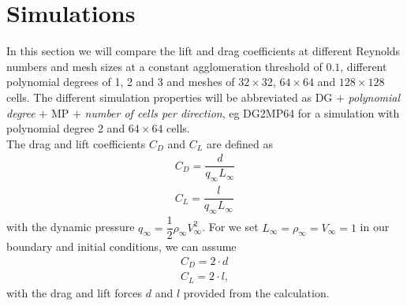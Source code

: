 \section{Simulations}
	In this section we will compare the lift and drag coefficients at different Reynolds numbers and mesh sizes at a constant agglomeration threshold of $0.1$, different polynomial degrees of 1, 2 and 3 and meshes of $32 \times 32$, $64 \times 64$ and $128 \times 128$ cells. The different simulation properties will be abbreviated as DG $+$ \textit{polynomial degree} $+$ MP $+$ \textit{number of cells per direction}, eg DG2MP64 for a simulation with polynomial degree 2 and $64 \times 64$ cells.\\
	 The drag and lift coefficients $C_D$ and $C_L$ are defined as
	\begin{align}
		C_D = \dfrac{d}{q_\infty L_\infty} \\
		C_L = \dfrac{l}{q_\infty L_\infty}
	\end{align}
	with the dynamic pressure $q_\infty = \dfrac{1}{2} \rho_\infty V_\infty^2$. For we set $L_\infty = \rho_\infty = V_\infty = 1$ in our boundary and initial conditions, we can assume
	\begin{align}
		C_D = 2 \cdot d \\
		C_L = 2 \cdot l,
	\end{align}
	with the drag and lift forces $d$ and $l$ provided from the calculation.
	
	
	
